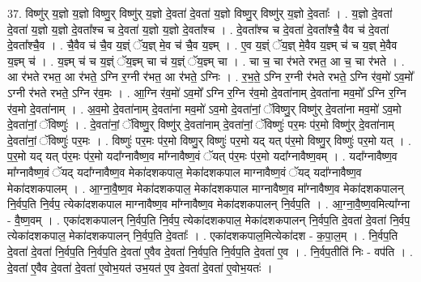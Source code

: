 \documentclass[17pt]{extarticle}
\begin{document}
37. विष्णु॑र् य॒ज्ञो य॒ज्ञो विष्णु॒र् विष्णु॑र् य॒ज्ञो दे॒वता॑ दे॒वता॑ य॒ज्ञो विष्णु॒र् विष्णु॑र् य॒ज्ञो दे॒वताः᳚ । . य॒ज्ञो दे॒वता॑ दे॒वता॑ य॒ज्ञो य॒ज्ञो दे॒वता᳚श्च च दे॒वता॑ य॒ज्ञो य॒ज्ञो दे॒वता᳚श्च । . दे॒वता᳚श्च च दे॒वता॑ दे॒वता᳚श्चै॒ वैव च॑ दे॒वता॑ दे॒वता᳚श्चै॒व । . चै॒वैव च॑ चै॒व य॒ज्ञ्ं ॅय॒ज्ञ् मे॒व च॑ चै॒व य॒ज्ञ्म् । . ए॒व य॒ज्ञ्ं ॅय॒ज्ञ् मे॒वैव य॒ज्ञ्म् च॑ च य॒ज्ञ् मे॒वैव य॒ज्ञ्म् च॑ । . य॒ज्ञ्म् च॑ च य॒ज्ञ्ं ॅय॒ज्ञ्म् चा च॑ य॒ज्ञ्ं ॅय॒ज्ञ्म् चा । . चा च॒ चा र॑भते रभत॒ आ च॒ चा र॑भते । . आ र॑भते रभत॒ आ र॑भते॒ ऽग्नि र॒ग्नी र॑भत॒ आ र॑भते॒ ऽग्निः । . र॒भ॒ते॒ ऽग्नि र॒ग्नी र॑भते रभते॒ ऽग्नि र॑व॒मो॑ ऽव॒मो᳚ ऽग्नी र॑भते रभते॒ ऽग्नि र॑व॒मः । . आ॒ग्नि र॑व॒मो॑ ऽव॒मो᳚ ऽग्नि र॒ग्नि र॑व॒मो दे॒वता॑नाम् दे॒वता॑ना मव॒मो᳚ ऽग्नि र॒ग्नि र॑व॒मो दे॒वता॑नाम् । . अ॒व॒मो दे॒वता॑नाम् दे॒वता॑ना मव॒मो॑ ऽव॒मो दे॒वता॑नां॒ ॅविष्णु॒र् विष्णु॑र् दे॒वता॑ना मव॒मो॑ ऽव॒मो दे॒वता॑नां॒ ॅविष्णुः॑ । . दे॒वता॑नां॒ ॅविष्णु॒र् विष्णु॑र् दे॒वता॑नाम् दे॒वता॑नां॒ ॅविष्णुः॑ पर॒मः प॑र॒मो विष्णु॑र् दे॒वता॑नाम् दे॒वता॑नां॒ ॅविष्णुः॑ पर॒मः । . विष्णुः॑ पर॒मः प॑र॒मो विष्णु॒र् विष्णुः॑ पर॒मो यद् यत् प॑र॒मो विष्णु॒र् विष्णुः॑ पर॒मो यत् । . प॒र॒मो यद् यत् प॑र॒मः प॑र॒मो यदा᳚ग्नावैष्ण॒व मा᳚ग्नावैष्ण॒वं ॅयत् प॑र॒मः प॑र॒मो यदा᳚ग्नावैष्ण॒वम् । . यदा᳚ग्नावैष्ण॒व मा᳚ग्नावैष्ण॒वं ॅयद् यदा᳚ग्नावैष्ण॒व मेका॑दशकपाल॒ मेका॑दशकपाल माग्नावैष्ण॒वं ॅयद् यदा᳚ग्नावैष्ण॒व मेका॑दशकपालम् । . आ॒ग्ना॒वै॒ष्ण॒व मेका॑दशकपाल॒ मेका॑दशकपाल माग्नावैष्ण॒व मा᳚ग्नावैष्ण॒व मेका॑दशकपालन् नि॒र्वप॒ति नि॒र्वप॒ त्येका॑दशकपाल माग्नावैष्ण॒व मा᳚ग्नावैष्ण॒व मेका॑दशकपालन् नि॒र्वप॒ति । . आ॒ग्ना॒वै॒ष्ण॒वमित्या᳚ग्ना - वै॒ष्ण॒वम् । . एका॑दशकपालन् नि॒र्वप॒ति नि॒र्वप॒ त्येका॑दशकपाल॒ मेका॑दशकपालन् नि॒र्वप॒ति दे॒वता॑ दे॒वता॑ नि॒र्वप॒ त्येका॑दशकपाल॒ मेका॑दशकपालन् नि॒र्वप॒ति दे॒वताः᳚ । . एका॑दशकपाल॒मित्येका॑दश - क॒पा॒ल॒म् । . नि॒र्वप॒ति दे॒वता॑ दे॒वता॑ नि॒र्वप॒ति नि॒र्वप॒ति दे॒वता॑ ए॒वैव दे॒वता॑ नि॒र्वप॒ति नि॒र्वप॒ति दे॒वता॑ ए॒व । . नि॒र्वप॒तीति॑ निः - वप॑ति । . दे॒वता॑ ए॒वैव दे॒वता॑ दे॒वता॑ ए॒वोभ॒यत॑ उभ॒यत॑ ए॒व दे॒वता॑ दे॒वता॑ ए॒वोभ॒यतः॑ । \newline
\pagebreak
{}
\end{document}
